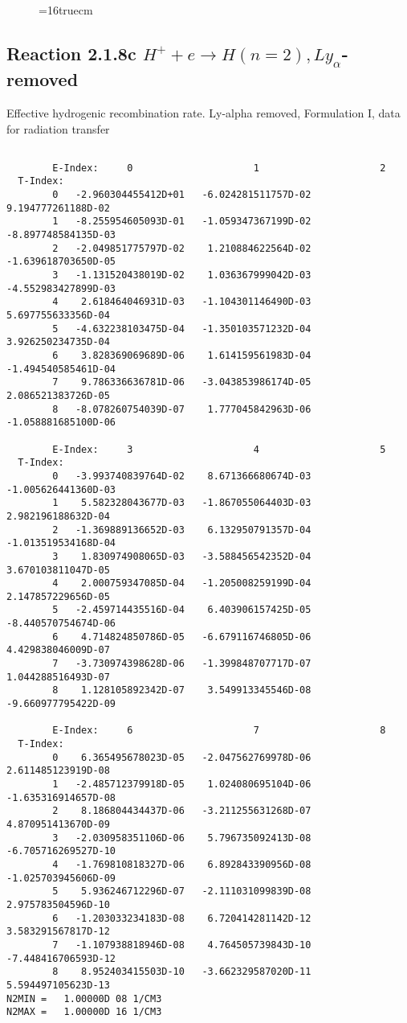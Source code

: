 \documentclass[12pt,dvipdfmx]{article}
\begin{document}
\begin{figure} \label{2.1.8b}
\epsfxsize=16truecm
\end{figure}
\newpage
\subsection{
Reaction 2.1.8c  $H^+ + e \rightarrow H(n=2), Ly_\alpha$-removed
}


   Effective hydrogenic recombination rate.
   Ly-alpha removed, Formulation I, data for radiation transfer

\begin{small}\begin{verbatim}

        E-Index:     0                     1                     2
  T-Index:
        0   -2.960304455412D+01   -6.024281511757D-02    9.194777261188D-02
        1   -8.255954605093D-01   -1.059347367199D-02   -8.897748584135D-03
        2   -2.049851775797D-02    1.210884622564D-02   -1.639618703650D-05
        3   -1.131520438019D-02    1.036367999042D-03   -4.552983427899D-03
        4    2.618464046931D-03   -1.104301146490D-03    5.697755633356D-04
        5   -4.632238103475D-04   -1.350103571232D-04    3.926250234735D-04
        6    3.828369069689D-06    1.614159561983D-04   -1.494540585461D-04
        7    9.786336636781D-06   -3.043853986174D-05    2.086521383726D-05
        8   -8.078260754039D-07    1.777045842963D-06   -1.058881685100D-06

        E-Index:     3                     4                     5
  T-Index:
        0   -3.993740839764D-02    8.671366680674D-03   -1.005626441360D-03
        1    5.582328043677D-03   -1.867055064403D-03    2.982196188632D-04
        2   -1.369889136652D-03    6.132950791357D-04   -1.013519534168D-04
        3    1.830974908065D-03   -3.588456542352D-04    3.670103811047D-05
        4    2.000759347085D-04   -1.205008259199D-04    2.147857229656D-05
        5   -2.459714435516D-04    6.403906157425D-05   -8.440570754674D-06
        6    4.714824850786D-05   -6.679116746805D-06    4.429838046009D-07
        7   -3.730974398628D-06   -1.399848707717D-07    1.044288516493D-07
        8    1.128105892342D-07    3.549913345546D-08   -9.660977795422D-09

        E-Index:     6                     7                     8
  T-Index:
        0    6.365495678023D-05   -2.047562769978D-06    2.611485123919D-08
        1   -2.485712379918D-05    1.024080695104D-06   -1.635316914657D-08
        2    8.186804434437D-06   -3.211255631268D-07    4.870951413670D-09
        3   -2.030958351106D-06    5.796735092413D-08   -6.705716269527D-10
        4   -1.769810818327D-06    6.892843390956D-08   -1.025703945606D-09
        5    5.936246712296D-07   -2.111031099839D-08    2.975783504596D-10
        6   -1.203033234183D-08    6.720414281142D-12    3.583291567817D-12
        7   -1.107938818946D-08    4.764505739843D-10   -7.448416706593D-12
        8    8.952403415503D-10   -3.662329587020D-11    5.594497105623D-13
N2MIN =   1.00000D 08 1/CM3
N2MAX =   1.00000D 16 1/CM3


\end{verbatim}
\end{small}
\end{document}
